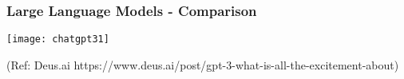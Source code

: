     
  





\begin{frame}[fragile]\frametitle{Large Language Models - Comparison}

\begin{center}
\texttt{[image: chatgpt31]}
\end{center}				
{\tiny (Ref: Deus.ai https://www.deus.ai/post/gpt-3-what-is-all-the-excitement-about)}

\end{frame}




